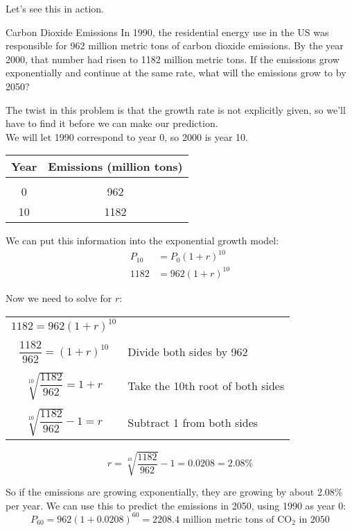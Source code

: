 Let's see this in action.

\begin{example}[https://www.youtube.com/watch?v=2wtJ_T3_e7o]{Carbon Dioxide Emissions}
In 1990, the residential energy use in the US was responsible for 962 million metric tons of carbon dioxide emissions.  By the year 2000, that number had risen to 1182 million metric tons.  If the emissions grow exponentially and continue at the same rate, what will the emissions grow to by 2050?

\solline
{}
The twist in this problem is that the growth rate is not explicitly given, so we'll have to find it before we can make our prediction.\\

We will let 1990 correspond to year 0, so 2000 is year 10.
\begin{center}
\begin{tabular}{c c}
\textbf{Year} & \textbf{Emissions (million tons)}\\
\hline
& \\
0 & 962\\
10 & 1182
\end{tabular}
\end{center}
We can put this information into the exponential growth model:
\begin{align*}
P_{10} &= P_0(1+r)^{10}\\
1182 &= 962(1+r)^{10}
\end{align*}

Now we need to solve for $r$:
\begin{center}
\begin{tabular}{c l}
$1182 = 962(1+r)^{10}$ & \\
& \\
$\dfrac{1182}{962} = (1+r)^{10}$ & Divide both sides by 962\\
& \\
$\sqrt[10]{\dfrac{1182}{962}} = 1+r$ & Take the 10th root of both sides\\
& \\
$\sqrt[10]{\dfrac{1182}{962}}-1 = r$ & Subtract 1 from both sides
\end{tabular}
\end{center}
\[r=\sqrt[10]{\dfrac{1182}{962}}-1 = 0.0208 = 2.08\%\]

So if the emissions are growing exponentially, they are growing by about 2.08\% per year.  We can use this to predict the emissions in 2050, using 1990 as year 0:
\[P_{60} = 962(1+0.0208)^{60} = \boxed{2208.4 \textrm{ million metric tons of CO}_2 \textrm{ in 2050}}\]
\end{example}

